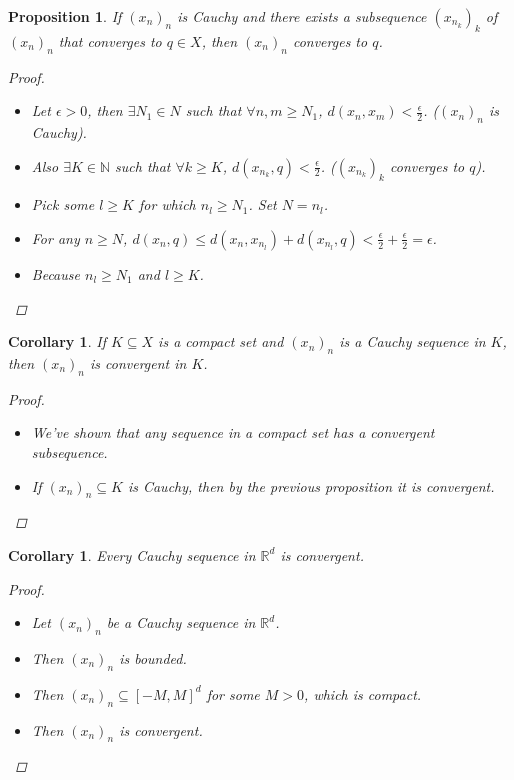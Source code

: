 \documentclass[10pt]{article}
\newcommand{\N}{\mathbb{N}}
\newcommand{\R}{\mathbb{R}}
\newtheorem{corollary}[theorem]{Corollary}
\newtheorem{proposition}[theorem]{Proposition}
\theoremstyle{definition}
\theoremstyle{remark}
\begin{document}
\begin{proposition}
    If $(x_n)_n$ is Cauchy and there exists a subsequence $(x_{n_k})_k$ of $(x_n)_n$ that converges to $q \in X$, then $(x_n)_n$ converges to $q$.
    \begin{proof}
        \hfill
        \begin{itemize}
            \item Let $\epsilon > 0$, then $\exists N_1 \in N$ such that $\forall n, m \geq N_1$, $d(x_n, x_m) < \frac{\epsilon}{2}$.
                ($(x_n)_n$ is Cauchy).
            \item Also $\exists K \in \N$ such that $\forall k \geq K$, $d(x_{n_k}, q) < \frac{\epsilon}{2}$.
                ($(x_{n_k})_k$ converges to $q$).
            \item Pick some $l \geq K$ for which $n_l \geq N_1$. Set $N = n_l$.
            \item For any $n \geq N$, $d(x_n, q) \leq d(x_n, x_{n_l}) + d(x_{n_l}, q) < \frac{\epsilon}{2} + \frac{\epsilon}{2} = \epsilon$.
            \item Because $n_l \geq N_1$ and $l \geq K$.
        \end{itemize}
    \end{proof}
\end{proposition}

\begin{corollary}
    If $K \subseteq X$ is a compact set and $(x_n)_n$ is a Cauchy sequence in $K$, then $(x_n)_n$ is convergent in $K$.
    \begin{proof}
        \hfill
        \begin{itemize}
            \item We've shown that any sequence in a compact set has a convergent subsequence.
            \item If $(x_n)_n \subseteq K$ is Cauchy, then by the previous proposition it is convergent.
        \end{itemize}
    \end{proof}
\end{corollary}

\begin{corollary}
    Every Cauchy sequence in $\R^d$ is convergent.
    \begin{proof}
        \hfill
        \begin{itemize}
            \item Let $(x_n)_n$ be a Cauchy sequence in $\R^d$.
            \item Then $(x_n)_n$ is bounded.
            \item Then $(x_n)_n \subseteq [-M, M]^d$ for some $M > 0$, which is compact.
            \item Then $(x_n)_n$ is convergent.
        \end{itemize}
    \end{proof}
\end{corollary}
\end{document}
